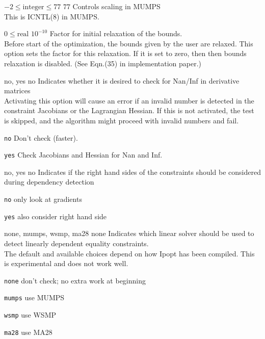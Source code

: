 %
{$-2\leq\textrm{integer}\leq77$}%
{$77$}%
{Controls scaling in MUMPS\\
This is ICNTL(8) in MUMPS.}%
{}

%
{$0\leq\textrm{real}$}%
{$10^{-10}$}%
{Factor for initial relaxation of the bounds.\\
Before start of the optimization, the bounds given by the user are relaxed.  This option sets the factor for this relaxation.  If it is set to zero, then then bounds relaxation is disabled. (See Eqn.(35) in implementation paper.)}%
{}

%
{no, yes}%
{no}%
{Indicates whether it is desired to check for Nan/Inf in derivative matrices\\
Activating this option will cause an error if an invalid number is detected in the constraint Jacobians or the Lagrangian Hessian.  If this is not activated, the test is skipped, and the algorithm might proceed with invalid numbers and fail.}%
{\begin{list}{}{
\setlength{\parsep}{0em}
\setlength{\leftmargin}{5ex}
\setlength{\labelwidth}{2ex}
\setlength{\itemindent}{0ex}
\setlength{\topsep}{0pt}}
\item[\texttt{no}] Don't check (faster).
\item[\texttt{yes}] Check Jacobians and Hessian for Nan and Inf.
\end{list}
}

%
{no, yes}%
{no}%
{Indicates if the right hand sides of the constraints should be considered during dependency detection}%
{\begin{list}{}{
\setlength{\parsep}{0em}
\setlength{\leftmargin}{5ex}
\setlength{\labelwidth}{2ex}
\setlength{\itemindent}{0ex}
\setlength{\topsep}{0pt}}
\item[\texttt{no}] only look at gradients
\item[\texttt{yes}] also consider right hand side
\end{list}
}

%
{none, mumps, wsmp, ma28}%
{none}%
{Indicates which linear solver should be used to detect linearly dependent equality constraints.\\
The default and available choices depend on how Ipopt has been compiled.  This is experimental and does not work well.}%
{\begin{list}{}{
\setlength{\parsep}{0em}
\setlength{\leftmargin}{5ex}
\setlength{\labelwidth}{2ex}
\setlength{\itemindent}{0ex}
\setlength{\topsep}{0pt}}
\item[\texttt{none}] don't check; no extra work at beginning
\item[\texttt{mumps}] use MUMPS
\item[\texttt{wsmp}] use WSMP
\item[\texttt{ma28}] use MA28
\end{list}
}

